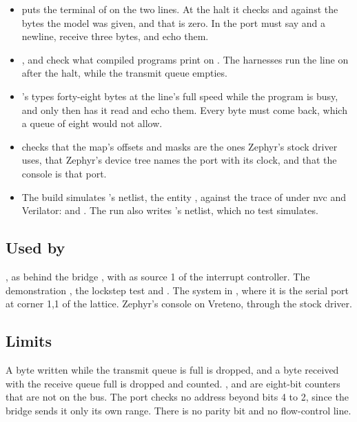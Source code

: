 \begin{itemize}
\item {} puts the terminal of
 on the two lines. At the halt it checks  and
 against the bytes the model was given, and that
 is zero. In  the port must say
 and a newline, receive three bytes, and echo them.
\item {},
 and 
check what compiled programs print on . The harnesses run the
line on after the halt, while the transmit queue empties.
\item {}'s
types forty-eight bytes at the line's full speed while the program is
busy, and only then has it read and echo them. Every byte must come
back, which a queue of eight would not allow.
\item {} checks that the map's
offsets and masks are the ones Zephyr's stock 
driver uses, that Zephyr's device tree names the port
 with its clock, and that the console is that port.
\item The build simulates 's netlist, the entity
, against the trace of  under
nvc and Verilator: 
and . The run also writes
's netlist, which no test simulates.
\end{itemize}

\subsection*{Used by}

, as  behind the bridge , with
 as source 1 of the interrupt controller. The
demonstration , the lockstep test and
. The system in , where it is the serial port at
corner 1,1 of the lattice. Zephyr's console on Vreteno, through the
stock  driver.

\subsection*{Limits}

A byte written while the transmit queue is full is dropped, and a
byte received with the receive queue full is dropped and counted.
,  and  are eight-bit counters
that are not on the bus. The port checks no address beyond bits 4 to
2, since the bridge sends it only its own range. There is no parity
bit and no flow-control line.
